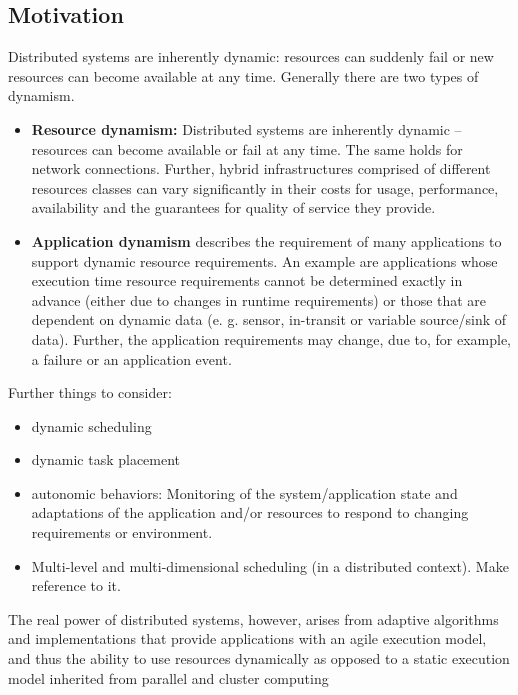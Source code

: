\documentclass[conference,final]{IEEEtran}
\begin{document}
\subsection{Motivation}

Distributed systems are inherently dynamic: resources can suddenly fail or 
new resources can become available at any time. Generally there are two types
of dynamism.
\begin{itemize}
\item \textbf{Resource dynamism:} Distributed systems are inherently dynamic
     -- resources can become available or fail at any time. The same holds for
      network connections. Further, hybrid infrastructures comprised of 
      different resources classes can vary significantly in their costs for 
      usage, performance, availability and the guarantees for quality of service 
      they provide.
      
\item \textbf{Application dynamism} describes the requirement of many
applications to support dynamic resource requirements. An example are
applications whose execution time resource requirements cannot be determined
exactly in advance (either due to changes in runtime requirements) or those that
are dependent on dynamic data (e. g. sensor, in-transit or variable source/sink
of data). Further, the application requirements may change, due to,
for example, a failure or an application event.
\end{itemize}

Further things to consider:
\begin{itemize}
    \item dynamic scheduling
    \item dynamic task placement
    \item autonomic behaviors: Monitoring of the system/application state and 
    adaptations of the application and/or resources to respond to changing 
    requirements or environment.
  \item Multi-level and multi-dimensional scheduling (in a distributed
    context). Make reference to it.
\end{itemize}

The real power of distributed systems, however, arises from adaptive algorithms
and implementations that provide applications with an agile execution model, and
thus the ability to use resources dynamically as opposed to a static execution
model inherited from parallel and cluster computing
\end{document}
